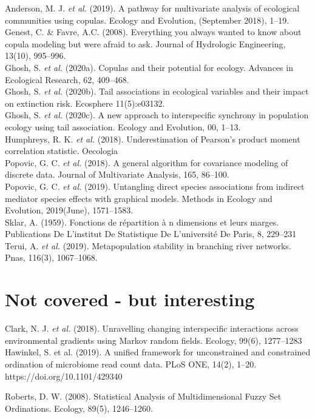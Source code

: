 \documentclass{article}
\begin{document}
Anderson, M. J. \textit{et al.} (2019). A pathway for multivariate analysis of ecological communities using copulas. Ecology and Evolution, (September 2018), 1–19.\\

Genest, C. \& Favre, A.C. (2008). Everything you always wanted to know about copula modeling but were afraid to ask. Journal of Hydrologic Engineering, 13(10), 995–996.\\

Ghosh, S. \textit{et al.} (2020a). Copulas and their potential for ecology. Advances in Ecological Research, 62, 409–468. \\

Ghosh, S. \textit{et al.} (2020b). Tail associations in ecological variables and their impact on extinction risk. Ecosphere 11(5):e03132. \\

Ghosh, S. \textit{et al.} (2020c). A new approach to interspecific synchrony in population ecology using tail association. Ecology and Evolution, 00, 1–13. \\

Humphreys, R. K. \textit{et al.} (2018). Underestimation of Pearson’s product moment correlation statistic. Oecologia\\

Popovic, G. C. \textit{et al.} (2018). A general algorithm for covariance modeling of discrete data. Journal of Multivariate Analysis, 165, 86–100.\\

Popovic, G. C. \textit{et al.} (2019). Untangling direct species associations from indirect mediator species effects with graphical models. Methods in Ecology and Evolution, 2019(June), 1571–1583.\\

Sklar, A. (1959). Fonctions de répartition à n dimensions et leurs marges. Publications De L’institut De Statistique De L’université De Paris, 8, 229–231\\ 

Terui, A. \textit{et al.} (2019). Metapopulation stability in branching river networks. Pnas, 116(3), 1067–1068.\\

\section{Not covered - but interesting}

Clark, N. J. \textit{et al.} (2018). Unravelling changing interspecific interactions across environmental gradients using Markov random fields. Ecology, 99(6), 1277–1283\\

Hawinkel, S. et al. (2019). A unified framework for unconstrained and constrained ordination of microbiome read count data. PLoS ONE, 14(2), 1–20. https://doi.org/10.1101/429340

Roberts, D. W. (2008). Statistical Analysis of Multidimensional Fuzzy Set Ordinations. Ecology, 89(5), 1246–1260.\\
\end{document}
